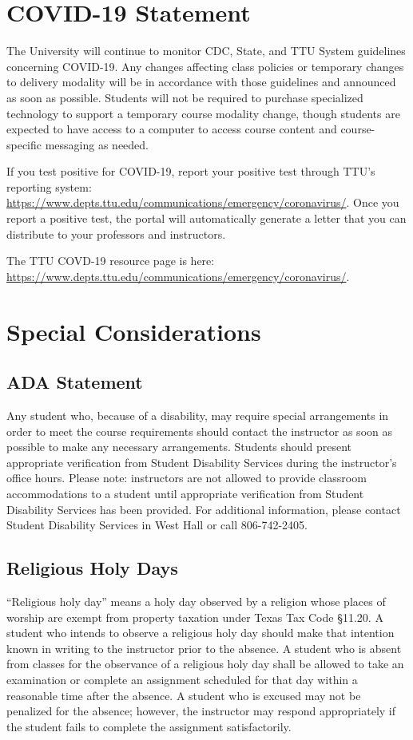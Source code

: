 \documentclass[12pt, notitlepage]{article}   	%
\begin{document}
{\section{COVID-19 Statement}
The University will continue to monitor CDC, State, and TTU System guidelines concerning COVID-19. 
Any changes affecting class policies or temporary changes to delivery modality will be in 
accordance with those guidelines and announced as soon as possible. Students will not be 
required to purchase specialized technology to support a temporary course modality change, 
though students are expected to have access to a computer to access course content and 
course-specific messaging as needed. 

If you test positive for COVID-19, report your positive test through TTU's reporting system: 
\url{https://www.depts.ttu.edu/communications/emergency/coronavirus/}. Once you report a positive 
test, the portal will automatically generate a letter that you can distribute to your 
professors and instructors.

The TTU COVD-19 resource page is here: \url{https://www.depts.ttu.edu/communications/emergency/coronavirus/}.

\section{Special Considerations}
\subsection{ADA Statement}
Any student who, because of a disability, may require special arrangements in order to 
meet the course requirements should contact the instructor as soon as possible to make 
any necessary arrangements. Students should present appropriate verification from Student 
Disability Services during the instructor's office hours. Please note: instructors are 
not allowed to provide classroom accommodations to a student until appropriate verification 
from Student Disability Services has been provided. For additional information, please 
contact Student Disability Services in West Hall or call 806-742-2405.

\subsection{Religious Holy Days}
“Religious holy day” means a holy day observed by a religion whose places of worship 
are exempt from property taxation under Texas Tax Code §11.20. 
A student who intends to observe a religious holy day should make that intention known 
in writing to the instructor prior to the absence. 
A student who is absent from classes for the observance of a religious holy day shall be 
allowed to take an examination or complete an assignment scheduled for that day within a 
reasonable time after the absence. 
A student who is excused may not be penalized for the absence; however, the instructor 
may respond appropriately if the student fails to complete the assignment satisfactorily.

}
\end{document}

